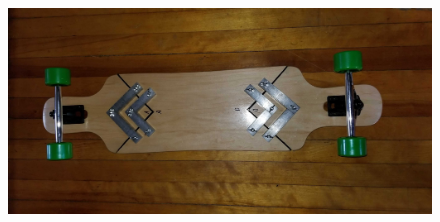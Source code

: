 \documentclass[letterpaper,12pt]{article}
\begin{document}
\begin{figure}[!htbp]\centering
\begin{minipage}{.5\textwidth}\centering
\includegraphics[width=\textwidth]{figs/board-underside.jpg}
\label{board-underside}
\end{minipage}
\end{figure}


\end{document}
